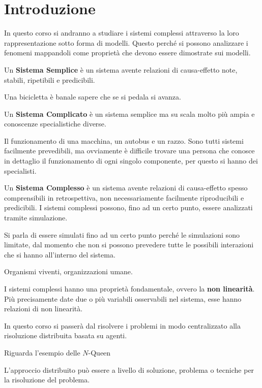\chapter{Introduzione}
In questo corso si andranno a studiare i sistemi complessi attraverso la loro 
rappresentazione sotto forma di modelli. Questo perché si possono analizzare i 
fenomeni mappandoli come proprietà che devono essere dimostrate sui modelli.
\begin{definizione} 
    Un \textbf{Sistema Semplice} è un sistema avente relazioni di causa-effetto
    note, stabili, ripetibili e predicibili.
\end{definizione}
\begin{esempio}
    Una bicicletta è banale sapere che se si pedala si avanza.
\end{esempio}
\begin{definizione} 
    Un \textbf{Sistema Complicato} è un sistema semplice ma su scala molto più ampia
    e conoscenze specialistiche diverse.
\end{definizione}
\begin{esempio}
    Il funzionamento di una macchina, un autobus e un razzo. Sono tutti sistemi 
    facilmente prevedibili, ma ovviamente è difficile trovare una persona che conosce
    in dettaglio il funzionamento di ogni singolo componente, per questo si hanno
    dei specialisti. 
\end{esempio}
\begin{definizione} 
    Un \textbf{Sistema Complesso} è un sistema avente relazioni di causa-effetto
    spesso comprensibili in retrospettiva, non necessariamente facilmente
    riproducibili e predicibili. I sistemi complessi possono, fino ad un certo 
    punto, essere analizzati tramite simulazione.
\end{definizione}
Si parla di essere simulati fino ad un certo punto perché le simulazioni sono 
limitate, dal momento che non si possono prevedere tutte le possibili interazioni 
che si hanno all'interno del sistema.
\begin{esempio}
    Organismi viventi, organizzazioni umane.
\end{esempio}
I sistemi complessi hanno una proprietà fondamentale, ovvero la \textbf{non linearità}.
Più precisamente date due o più variabili osservabili nel sistema, esse hanno 
relazioni di non linearità.

In questo corso si passerà dal risolvere i problemi in modo centralizzato alla
risoluzione distribuita basata su agenti.
\begin{esempio}
    Riguarda l'esempio delle $N$-Queen
\end{esempio}

L'approccio distribuito può essere a livello di soluzione, problema o tecniche per
la risoluzione del problema.
